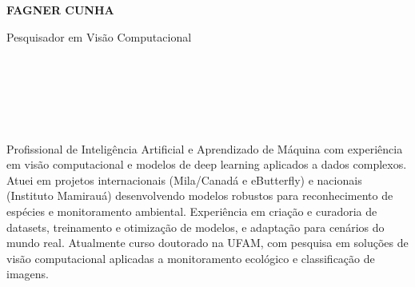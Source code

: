 \documentclass[10pt]{developercv}
\begin{document}
\begin{minipage}[t]{0.6\textwidth}
  \vspace{-\baselineskip}

  {\HUGE\textbf{\MakeUppercase{Fagner Cunha}}}
  \vspace{5pt}

  {\Large Pesquisador em Visão Computacional}

  \\

\end{minipage}
\begin{minipage}[t]{0.3\textwidth}
  \vspace{-\baselineskip}

 \\
\\ \\
\end{minipage}

\vspace{0.5cm}


\begin{minipage}[t]{\textwidth}

Profissional de Inteligência Artificial e Aprendizado de Máquina com experiência
em visão computacional e modelos de deep learning aplicados a dados complexos.
Atuei em projetos internacionais (Mila/Canadá e eButterfly) e nacionais
(Instituto Mamirauá) desenvolvendo modelos robustos para reconhecimento de
espécies e monitoramento ambiental. Experiência em criação e curadoria de
datasets, treinamento e otimização de modelos, e adaptação para cenários do
mundo real. Atualmente curso doutorado na UFAM, com pesquisa em soluções de
visão computacional aplicadas a monitoramento ecológico e classificação de
imagens. \\

\end{minipage}

\end{document}
